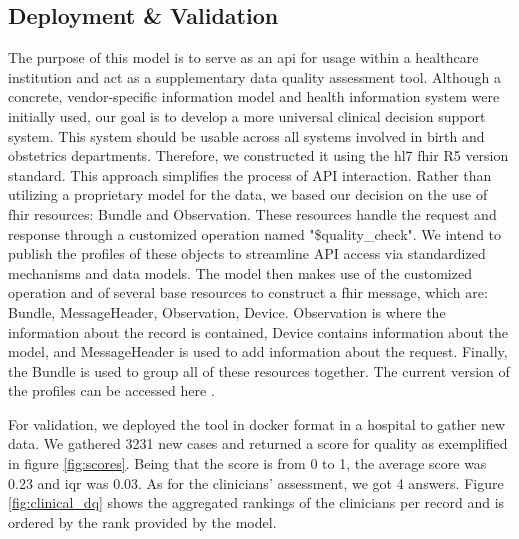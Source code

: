 \subsection{Deployment \& Validation}
The purpose of this model is to serve as an \ac{api} for usage within a healthcare institution and act as a supplementary data quality assessment tool. Although a concrete, vendor-specific information model and health information system were initially used, our goal is to develop a more universal clinical decision support system. This system should be usable across all systems involved in birth and obstetrics departments. Therefore, we constructed it using the \ac{hl7} \ac{fhir} R5 version standard. This approach simplifies the process of API interaction. Rather than utilizing a proprietary model for the data, we based our decision on the use of \ac{fhir} resources: Bundle and Observation. These resources handle the request and response through a customized operation named "\$quality\_check". We intend to publish the profiles of these objects to streamline API access via standardized mechanisms and data models. The model then makes use of the customized operation and of several base resources to construct a \ac{fhir} message, which are: Bundle, MessageHeader, Observation, Device. Observation is where the information about the record is contained, Device contains information about the model, and MessageHeader is used to add information about the request. Finally, the Bundle is used to group all of these resources together. The current version of the profiles can be accessed here \cite{almeidaObstetricsClinicalDecision}.

For validation, we deployed the tool in docker format in a hospital to gather new data. We gathered 3231 new cases and returned a score for quality as exemplified in figure \ref{fig:scores}. Being that the score is from 0 to 1, the average score was 0.23 and \ac{iqr} was 0.03.
As for the clinicians' assessment, we got 4 answers. Figure \ref{fig:clinical_dq} shows the aggregated rankings of the clinicians per record and is ordered by the rank provided by the model.



